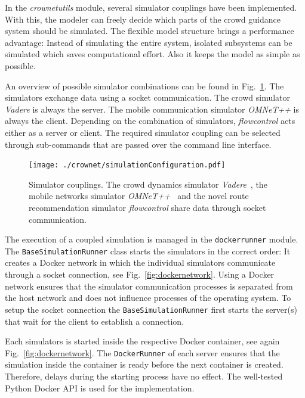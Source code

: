 
In the \textit{crownetutils} module, several simulator couplings have been implemented. With this, the modeler can freely decide which parts of the crowd guidance system should be simulated.   The flexible model structure brings a performance advantage: Instead of simulating the entire system, isolated subsystems can be simulated which saves computational effort. Also it keeps the model as simple as possible. 

An overview of possible simulator combinations can be found in Fig.~\ref{fig:simulator-coupling}. The simulators exchange data using a socket communication. The crowd simulator \textit{Vadere} is always the server. The mobile communication simulator \textit{OMNeT++} is always the client. Depending on the combination of simulators, \textit{flowcontrol} acts either as a server or client.  The required simulator coupling can be selected through sub-commands that are passed over the command line interface. 

\begin{figure}[hbt!]
\texttt{[image: ./crownet/simulationConfiguration.pdf]} 
\caption[Possible simulator couplings]{Simulator couplings. The crowd dynamics simulator \textit{Vadere}~\cite{kleinmeier-2019-cdyn}, the mobile networks simulator \textit{OMNeT++}~\cite{varga-2019-com} and the novel route recommendation simulator \textit{flowcontrol} share data through socket communication.  }
\label{fig:simulator-coupling}
\end{figure}

\newpage

The execution of a coupled simulation is managed in the \lstinline{dockerrunner} module. The  \lstinline{BaseSimulationRunner} class starts the simulators in the correct order: It creates a Docker network in which the individual simulators communicate through a socket connection, see Fig.~\ref{fig:dockernetwork}. 
Using a Docker network ensures that the simulator communication processes is separated from the host network and does not influence processes of the operating system. To setup the socket connection the \lstinline{BaseSimulationRunner} first starts the server(s) that wait for the client to establish a connection. \textit{}

Each simulators is started inside the respective Docker container, see again Fig.~\ref{fig:dockernetwork}. The \lstinline{DockerRunner} of each server ensures that the simulation inside the container is ready before the next container is created. Therefore, delays during the starting process have no effect. The well-tested Python Docker API is used for the implementation. \textit{}

